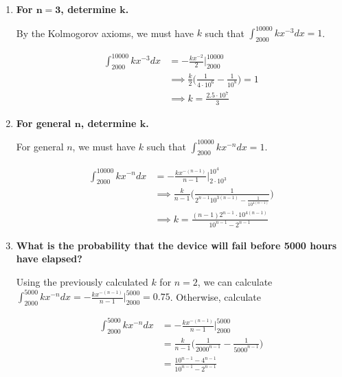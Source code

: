 \documentclass[10pt, oneside]{article}   	%
\theoremstyle{definition}
\begin{document}
\begin{enumerate}[label=4.\arabic*]
\begin{enumerate}
	\item  \begin{tcolorbox}[
	  colback=Cerulean!5!white,
	  colframe=Cerulean!75!black]
	\textbf{For $\bm{n = 3}$, determine $\bm{k}$.}
	\end{tcolorbox}
	
	By the Kolmogorov axioms, we must have $k$ such that $\int^{10000}_{2000} kx^{-3}dx = 1$.

	\begin{align*}
	\int^{10000}_{2000} kx^{-3}dx &= -\frac{kx^{-2}}{2} \big|^{10000}_{2000} \\
	&\implies \frac{k}{2} \Big( \frac{1}{4 \cdot 10^6} - \frac{1}{10^8} \Big) = 1 \\
	&\implies \boxed{k = \frac{2.5 \cdot 10^7}{3}}
	\end{align*}
	
	\item  \begin{tcolorbox}[
	  colback=Cerulean!5!white,
	  colframe=Cerulean!75!black]
	\textbf{For general $\bm{n}$, determine $\bm{k}$.}
	\end{tcolorbox}
	
	For general $n$, we must have $k$ such that $\int^{10000}_{2000} kx^{-n}dx = 1$.
	
	\begin{align*}
	\int^{10000}_{2000} kx^{-n}dx &= -\frac{kx^{-(n-1)}}{n-1} \Big|^{10^4}_{2 \cdot 10^3} \\
	&\implies \frac{k}{n-1} \Bigg( \frac{1}{2^{n-1} 10^{3(n-1)} - \frac{1}{10^{4(n-1)}}} \Bigg) \\
	&\implies \boxed{ k = \frac{(n-1) 2^{n-1} \cdot 10^{4(n-1)}}{10^{n-1} - 2^{n-1}} }
	\end{align*}
	
	\item  \begin{tcolorbox}[
	  colback=Cerulean!5!white,
	  colframe=Cerulean!75!black]
	\textbf{What is the probability that the device will fail before 5000 hours have elapsed?}
	\end{tcolorbox}
	
	Using the previously calculated $k$ for $n=2$, we can calculate $\int^{5000}_{2000} kx^{-n} dx = -\frac{kx^{-(n-1)}}{n-1} \Big|^{5000}_{2000} = \boxed{0.75}$. Otherwise, calculate
	
	\begin{align*}
	\int^{5000}_{2000} kx^{-n} dx &= -\frac{kx^{-(n-1)}}{n-1} \Big|^{5000}_{2000} \\
	&= \frac{k}{n-1} \Bigg( \frac{1}{2000^{n-1}} - \frac{1}{5000^{n-1}} \Bigg) \\
	&= \boxed{ \frac{10^{n-1} - 4^{n-1} }{10^{n-1} - 2^{n-1}} }
	\end{align*}
	

\end{enumerate}
\end{enumerate}
\end{document}
